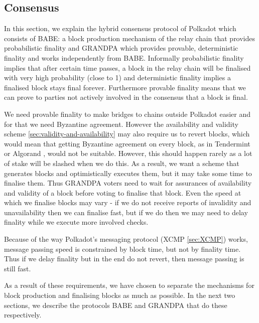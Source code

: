 \subsection{Consensus}\label{sec:consensus}

In this section, we explain the hybrid consensus protocol of Polkadot which consists of BABE: a block production mechanism of the relay chain that provides probabilistic finality and GRANDPA which provides provable, deterministic finality and works independently from BABE.  Informally probabilistic finality implies that after certain time passes, a block in the relay chain will be finalised with very high probability (close to 1) and deterministic finality implies a finalised block stays final forever. Furthermore provable finality means that we can prove to parties not actively involved in the consensus that a block is final.

We need provable finality to make bridges to chains outside Polkadot easier and for that we need Byzantine agreement. However the availability and validity scheme \ref{sec:validity-and-availability} may also require us to revert blocks, which would mean that getting Byzantine agreement on every block, as in Tendermint \cite{Tendermint} or Algorand \cite{ALGORAND}, would not be suitable. However, this should happen rarely as a lot of stake will be slashed when we do this. As a result, we want a scheme that generates blocks and optimistically executes them, but it may take some time to finalise them. Thus GRANDPA voters need to wait for assurances of availability and validity of a block before voting to finalise that block.
Even the speed at which we finalise blocks may vary - if we do not receive reports of invalidity and unavailability then we can finalise fast, but if we do then we may need to delay finality while we execute more involved checks. 

Because of the way Polkadot's messaging protocol (XCMP \ref{sec:XCMP}) works, message passing speed is constrained by block time, but not by finality time. Thus if we delay finality but in the end do not revert, then message passing is still fast.

As a result of these requirements, we have chosen to separate the mechanisms for block production and finalising blocks as much as possible. In the next two sections, we describe the protocols BABE and GRANDPA that do these respectively.




